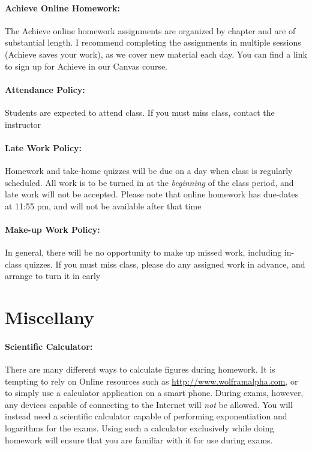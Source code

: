 \documentclass[12pt, letterpaper]{article}
\begin{document}
\paragraph{Achieve Online Homework:}
The Achieve online homework assignments are organized by chapter and are of substantial length. I recommend completing the assignments in multiple sessions (Achieve saves your work), as we cover new material each day. You can find a link to sign up for Achieve in our Canvas course.

\paragraph{Attendance Policy:}
Students are expected to attend class. If you must miss class, contact the instructor

\paragraph{Late Work Policy:}
Homework and take-home quizzes will be due on a day when class is regularly scheduled. All work is to be turned in at the \emph{beginning} of the class period, and late work will not be accepted. Please note that online homework has due-dates at 11:55 pm, and will not be available after that time

\paragraph{Make-up Work Policy:}
In general, there will be no opportunity to make up missed work, including in-class quizzes. If you must miss class, please do any assigned work in advance, and arrange to turn it in early

\section*{Miscellany}

\paragraph{Scientific Calculator:}
There are many different ways to calculate figures during homework. It is tempting to rely on Online resources such as \href{http://www.wolframalpha.com}{http://www.wolframalpha.com}, or to simply use a calculator application on a smart phone. During exams, however, any devices capable of connecting to the Internet will \emph{not} be allowed. You will instead need a scientific calculator capable of performing exponentiation and logarithms for the exams. Using such a calculator exclusively while doing homework will ensure that you are familiar with it for use during exams.
\end{document}
